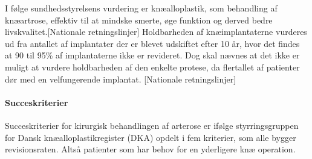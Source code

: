I følge sundhedsstyrelsens vurdering er knæalloplastik, som behandling af knæartrose, effektiv til at mindske smerte, øge funktion og derved bedre livskvalitet.[Nationale retningslinjer] Holdbarheden af knæimplantaterne vurderes ud fra antallet af implantater der er blevet udskiftet efter 10 år, hvor det findes at 90 til 95\% af implantaterne ikke er revideret. Dog skal nævnes at det ikke er muligt at vurdere holdbarheden af den enkelte protese, da flertallet af patienter dør med en velfungerende implantat. [Nationale retningslinjer]

\paragraph{Succeskriterier}

Succeskriterier for kirurgisk behandlingen af arterose er ifølge styrringsgruppen for Dansk knæalloplastikregister (DKA) \citep{aarsrapport2016} opdelt i fem kriterier, som alle bygger revisionsraten. Altså patienter som har behov for en yderligere knæ operation.  

